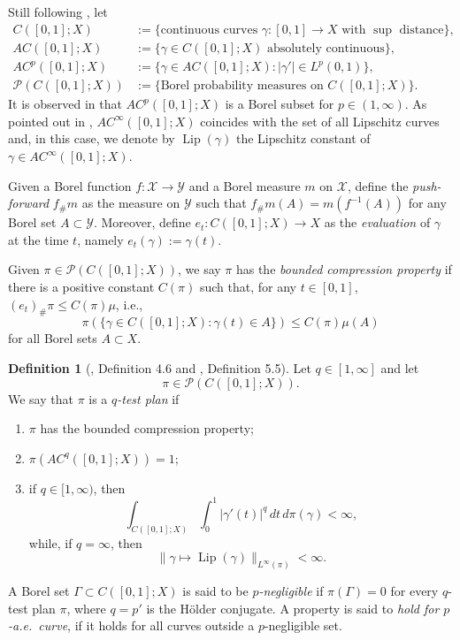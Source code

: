 \documentclass[11pt]{amsart}
\theoremstyle{definition}
\newtheorem{definition}[theorem]{Definition}
\theoremstyle{remark}
\numberwithin{equation}{section}
\newcommand{\abs}[1]{|#1|}
\newcommand{\Norm}[2]{\|#1\|_{#2}}
\begin{document}
Still following \cite[Section 2.1]{AGS:13}, let
\begin{equation*}
\begin{split}
  C([0,1];X) &:=\{\text{continuous curves $\gamma:[0,1]\to X$ with $\sup$ distance}\}, \\
  AC([0,1];X) &:=\{\gamma\in C([0,1];X) \text{ absolutely continuous}\}, \\
  AC^p([0,1];X) &:=\{\gamma\in AC([0,1];X):  \abs{\gamma'}\in L^p(0,1)\}, \\
  \mathscr P(C([0,1];X)) &:=
  \{\text{Borel probability measures on }C([0,1];X)\}.
\end{split}
\end{equation*}
It is observed in \cite[page 972]{AGS:13} that $AC^p([0,1];X)$ is a Borel subset for
$p\in(1,\infty)$. As pointed out in \cite[page 4154]{AD:14},
$AC^\infty([0,1];X)$ coincides with the set of all Lipschitz curves and, in this case,
we denote by ${\operatorname{Lip}}(\gamma)$ the Lipschitz constant of
$\gamma\in AC^\infty([0,1];X)$.

Given a Borel function $f:\mathcal{X}\to\mathcal{Y}$ and a Borel measure $m$
on $\mathcal{X}$, define the \emph{push-forward} $f_\#m$ as the measure on $\mathcal{Y}$
such that $f_\#m(A)=m(f^{-1}(A))$ for any Borel set $A\subset \mathcal Y$. Moreover, define
$e_t:C([0,1];X)\to X$ as the \emph{evaluation} of $\gamma$ at the time $t$, namely
$e_t(\gamma):=\gamma(t)$.

Given $\pi\in \mathscr P(C([0,1];X))$,
we say $\pi$ has the \emph{bounded compression property} if
there is a positive constant $C(\pi)$ such that, for any
$t\in[0,1]$,
$(e_t)_\#\pi\leq C(\pi)\mu$, i.e.,
\begin{equation}\label{it:C(pi)}
   \pi(\{\gamma\in C([0,1];X):\gamma(t)\in A\})\leq C(\pi)\mu(A)
\end{equation}
for all Borel sets $A\subset X$.

\begin{definition}[\cite{AGS:13}, Definition 4.6 and \cite{AD:14}, Definition 5.5]\label{def:fzplan}
Let $q\in [1,\infty]$ and let
$$\pi\in\mathscr P(C([0,1];X)).$$
We say that $\pi$ is
a \emph{$q$-test plan} if
\begin{enumerate}[\rm(i)]
  \item $\pi$ has the bounded compression property;
  \item\label{it:pi(AC)=1} $\pi(AC^q([0,1];X))=1$;
  \item\label{it:doubleInt} if $q\in[1,\infty)$, then
  $$
  \int_{C([0,1];X)}\int_0^1\abs{\gamma'(t)}^q\,dt\,d\pi(\gamma)<\infty,
  $$
  while, if $q=\infty$, then
  $$
  \Norm{\gamma\mapsto\operatorname{Lip}(\gamma)}{L^\infty(\pi)}<\infty.
  $$
\end{enumerate}
A Borel set $\Gamma\subset C([0,1];X)$ is said to be {\em $p$-negligible}
if $\pi(\Gamma)=0$ for every $q$-test plan $\pi$,
where $q=p'$ is the H\"older conjugate.
A property is said to \emph{hold for $p$-a.e.\ curve},
if it holds for all curves outside a $p$-negligible set.
\end{definition}
\end{document}
